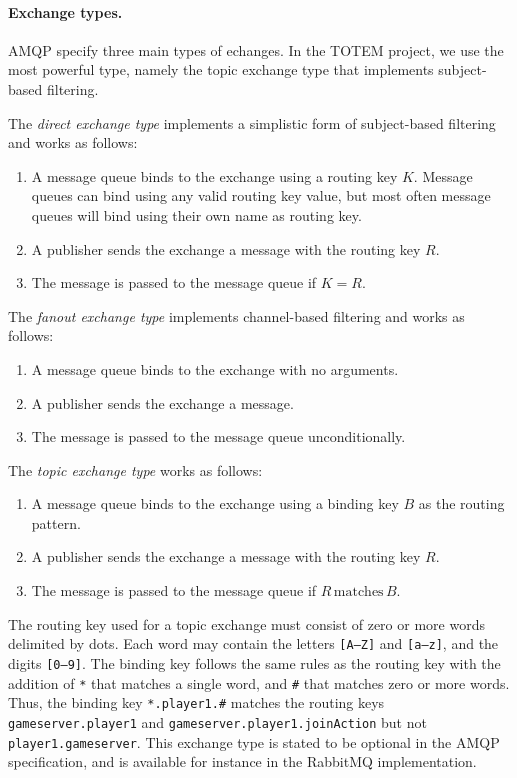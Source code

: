 \paragraph{Exchange types.} AMQP specify three main types of
echanges. In the TOTEM project, we use the most powerful type, namely
the topic exchange type that implements subject-based filtering.

The \textit{direct exchange type} implements a simplistic
form of subject-based filtering and works as follows:
\begin{enumerate}
\item A message queue binds to the exchange using a routing key
  $K$. Message queues can bind using any valid routing key value, but
  most often message queues will bind using their own name as routing
  key.
\item A publisher sends the exchange a message with the routing key
  $R$.
\item The message is passed to the message queue if $K = R$.
\end{enumerate}

The \textit{fanout exchange type} implements channel-based filtering
and works as follows:
\begin{enumerate}
\item A message queue binds to the exchange with no arguments.
\item A publisher sends the exchange a message.
\item The message is passed to the message queue unconditionally.
\end{enumerate}

The \textit{topic exchange type} works as follows:
\begin{enumerate}
\item A message queue binds to the exchange using a binding key $B$ as the
  routing pattern.
\item A publisher sends the exchange a message with the routing key
  $R$.
\item The message is passed to the message queue if $R \,
  \textrm{matches} \, B$.
\end{enumerate}
The routing key used for a topic exchange must consist of zero or more
words delimited by dots. Each word may contain the letters
\texttt{[A--Z]} and \texttt{[a--z]}, and the digits \texttt{[0--9]}.
The binding key follows the same rules as the routing key with the
addition of \texttt{*} that matches a single word, and \texttt{\#} that
matches zero or more words. Thus, the binding key
\texttt{*.player1.\#} matches the routing keys
\texttt{gameserver.player1} and \texttt{gameserver.player1.joinAction}
but not \texttt{player1.gameserver}. This exchange type is stated to
be optional in the AMQP specification, and is available for instance
in the \textsf{\textsf{RabbitMQ}} implementation.

